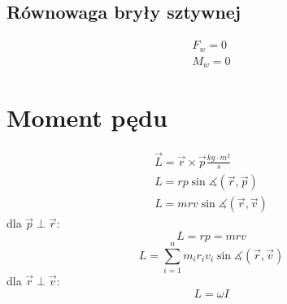     \subsection{Równowaga bryły sztywnej}
      \begin{gather}
        F_w = 0\\
        M_w = 0
      \end{gather}
  \section{Moment pędu}
    \begin{gather}
      \vec L = \vec r \times\vec p \unit{\frac{kg\cdot m^2}{s}}\\
      L = rp\sin\measuredangle(\vec r,\vec p)\\
      L = mrv\sin\measuredangle(\vec r,\vec v)
    \end{gather}
    dla $\vec p \perp \vec r$:
    \begin{equation}
      L = rp = mrv
    \end{equation}
    \begin{equation}
      L = \sum_{i=1}^n m_ir_iv_i\sin\measuredangle(\vec r,\vec v)
    \end{equation}
    dla $\vec r \perp \vec v$:
    \begin{equation}
      L = \omega I
    \end{equation}
